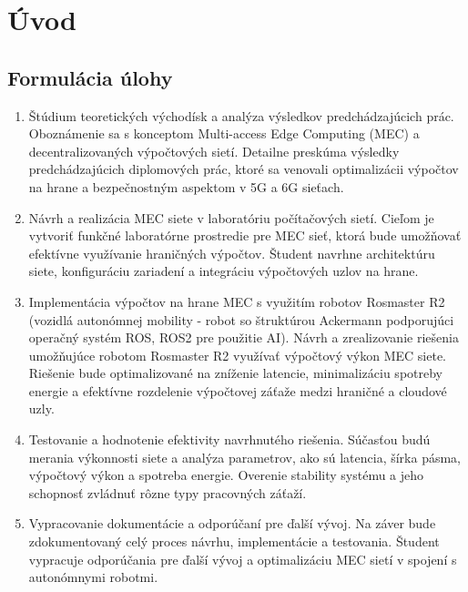 
\chapter{Úvod}\label{ch:introduction}




\section*{Formulácia úlohy}


\begin{enumerate}
 
    \item Štúdium teoretických východísk a analýza výsledkov predchádzajúcich prác. Oboznámenie sa s konceptom Multi-access Edge Computing (MEC) a decentralizovaných výpočtových sietí. Detailne preskúma výsledky predchádzajúcich diplomových prác, ktoré sa venovali optimalizácii výpočtov na hrane a bezpečnostným aspektom v 5G a 6G sieťach.
    \item Návrh a realizácia MEC siete v laboratóriu počítačových sietí. Cieľom je vytvoriť funkčné laboratórne prostredie pre MEC sieť, ktorá bude umožňovať efektívne využívanie hraničných výpočtov. Študent navrhne architektúru siete, konfiguráciu zariadení a integráciu výpočtových uzlov na hrane.
    \item Implementácia výpočtov na hrane MEC s využitím robotov Rosmaster R2 (vozidlá autonómnej mobility - robot so štruktúrou Ackermann podporujúci operačný systém ROS, ROS2 pre použitie AI). Návrh a zrealizovanie riešenia umožňujúce robotom Rosmaster R2 využívať výpočtový výkon MEC siete. Riešenie bude optimalizované na zníženie latencie, minimalizáciu spotreby energie a efektívne rozdelenie výpočtovej záťaže medzi hraničné a cloudové uzly.
    \item Testovanie a hodnotenie efektivity navrhnutého riešenia. Súčasťou budú merania výkonnosti siete a analýza parametrov, ako sú latencia, šírka pásma, výpočtový výkon a spotreba energie. Overenie stability systému a jeho schopnosť zvládnuť rôzne typy pracovných záťaží.
    \item Vypracovanie dokumentácie a odporúčaní pre ďalší vývoj. Na záver bude zdokumentovaný celý proces návrhu, implementácie a testovania. Študent vypracuje odporúčania pre ďalší vývoj a optimalizáciu MEC sietí v spojení s autonómnymi robotmi.

\end{enumerate}
